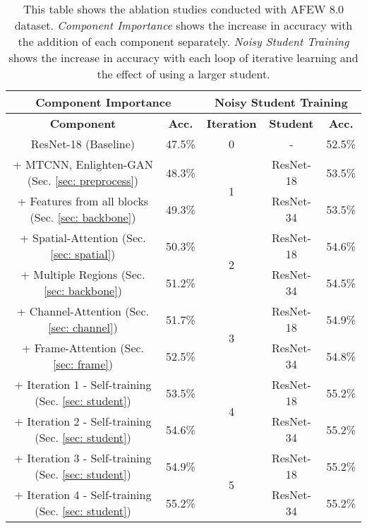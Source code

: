 \documentclass[runningheads]{llncs}
\begin{document}
\setlength{\tabcolsep}{4pt}
\begin{table}[t!] 
\begin{center}
\caption{This table shows the ablation studies conducted with AFEW 8.0 dataset. {\it Component Importance} shows the increase in accuracy with the addition of each component separately. {\it Noisy Student Training} shows the increase in accuracy with each loop of iterative learning and the effect of using a larger student.} \label{tab: ablation}
\label{table:headings}

 \begin{tabular}{cc|ccc}
\toprule
\multicolumn{2}{c}{\textbf{Component Importance}} & \multicolumn{3}{|c}{\textbf{Noisy Student Training}} \\
\hline
\textbf{Component}& \textbf{Acc.} & \textbf{Iteration} & \textbf{Student} & \textbf{Acc.}  \\
\hline
ResNet-18 (Baseline)  & 47.5\% & 0 &- &52.5\%\\
\cline{3-5}
+ MTCNN, Enlighten-GAN (Sec. \ref{sec: preprocess})& 48.3\% &\multirow{2}{*}{1}& ResNet-18 &53.5\%\\
+ Features from all blocks (Sec. \ref{sec: backbone}) & 49.3\% && ResNet-34 & 53.5\%\\
\cline{3-5}
+ Spatial-Attention (Sec. \ref{sec: spatial}) & 50.3\% &\multirow{2}{*}{2}& ResNet-18 &54.6\%\\
+ Multiple Regions (Sec. \ref{sec: backbone}) & 51.2\% && ResNet-34 &54.5\%\\
\cline{3-5}
+ Channel-Attention (Sec. \ref{sec: channel}) & 51.7\% &\multirow{2}{*}{3}& ResNet-18 &54.9\%\\
+ Frame-Attention (Sec. \ref{sec: frame}) & 52.5\% && ResNet-34 &54.8\%\\
\cline{3-5}
+ Iteration 1 - Self-training (Sec. \ref{sec: student}) & 53.5\% &\multirow{2}{*}{4}& ResNet-18 &55.2\%\\
+ Iteration 2 - Self-training (Sec. \ref{sec: student}) & 54.6\% && ResNet-34 &55.2\%\\
\cline{3-5}
+ Iteration 3 - Self-training (Sec. \ref{sec: student}) & 54.9\% &\multirow{2}{*}{5}& ResNet-18 &55.2\%\\
+ Iteration 4 - Self-training (Sec. \ref{sec: student}) & 55.2\%  && ResNet-34 &55.2\%\\
 
\bottomrule
\end{tabular}
\end{center}
\end{table}
\setlength{\tabcolsep}{1.4pt}
\end{document}
